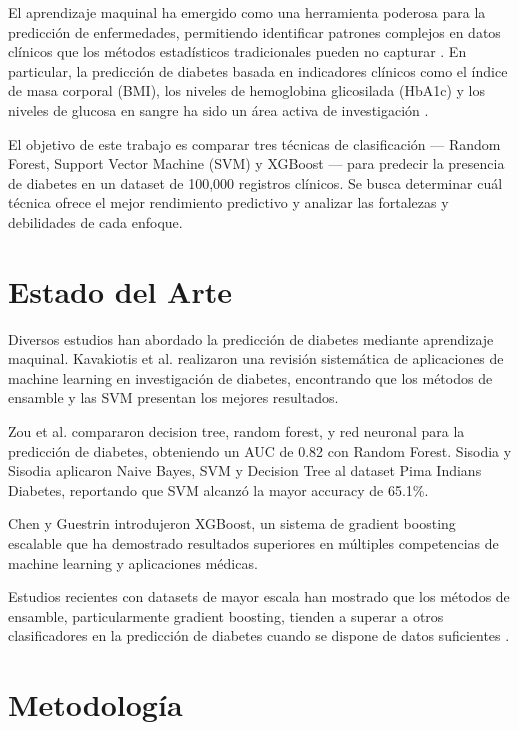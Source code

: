 \documentclass[conference]{IEEEtran}
\begin{document}
El aprendizaje maquinal ha emergido como una herramienta poderosa para la predicción de enfermedades, permitiendo identificar patrones complejos en datos clínicos que los métodos estadísticos tradicionales pueden no capturar \cite{kavakiotis2017}. En particular, la predicción de diabetes basada en indicadores clínicos como el índice de masa corporal (BMI), los niveles de hemoglobina glicosilada (HbA1c) y los niveles de glucosa en sangre ha sido un área activa de investigación \cite{zou2018}.

El objetivo de este trabajo es comparar tres técnicas de clasificación — Random Forest, Support Vector Machine (SVM) y XGBoost — para predecir la presencia de diabetes en un dataset de 100,000 registros clínicos. Se busca determinar cuál técnica ofrece el mejor rendimiento predictivo y analizar las fortalezas y debilidades de cada enfoque.

\section{Estado del Arte}

Diversos estudios han abordado la predicción de diabetes mediante aprendizaje maquinal. Kavakiotis et al. \cite{kavakiotis2017} realizaron una revisión sistemática de aplicaciones de machine learning en investigación de diabetes, encontrando que los métodos de ensamble y las SVM presentan los mejores resultados.

Zou et al. \cite{zou2018} compararon decision tree, random forest, y red neuronal para la predicción de diabetes, obteniendo un AUC de 0.82 con Random Forest. Sisodia y Sisodia \cite{sisodia2018} aplicaron Naive Bayes, SVM y Decision Tree al dataset Pima Indians Diabetes, reportando que SVM alcanzó la mayor accuracy de 65.1\%.

Chen y Guestrin \cite{chen2016} introdujeron XGBoost, un sistema de gradient boosting escalable que ha demostrado resultados superiores en múltiples competencias de machine learning y aplicaciones médicas.

Estudios recientes con datasets de mayor escala han mostrado que los métodos de ensamble, particularmente gradient boosting, tienden a superar a otros clasificadores en la predicción de diabetes cuando se dispone de datos suficientes \cite{ogunleye2020}.

\section{Metodología}
\end{document}
